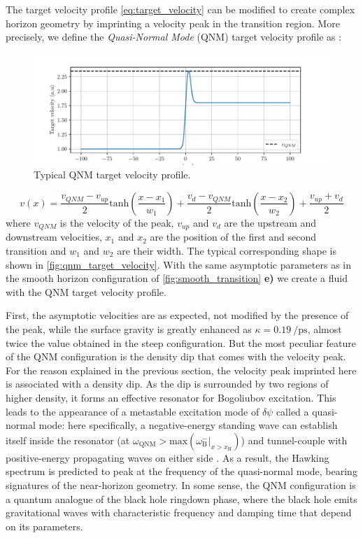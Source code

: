 The target velocity profile \autoref{eq:target_velocity} can be modified to create complex horizon geometry by imprinting 
a velocity peak in the transition region. More precisely, we define the \textit{Quasi-Normal Mode} (QNM) target velocity profile as :

\begin{figure}
    \centering
    \includegraphics[width=1\textwidth]{chap_custom_st/fig/qnm_target_velocity.pdf}
    \caption{Typical QNM target velocity profile.}
    \label{fig:qnm_target_velocity}
\end{figure}


\begin{equation}
    v(x)= \frac{v_{QNM}-v_{up}}{2}\mathrm{tanh}(\frac{x-x_1}{w_1})+ \frac{v_{d}-v_{QNM}}{2}\mathrm{tanh}(\frac{x-x_2}{w_2})+\frac{v_{up}+v_{d}}{2}
    \label{eq:target_velocity_qnm}
\end{equation}
where $v_{QNM}$ is the velocity of the peak, $v_{up}$ and $v_{d}$ are the upstream and downstream velocities, $x_1$ and $x_2$ are the position of the first and second transition and $w_1$ and $w_2$ are their width.
The typical corresponding shape is shown in \autoref{fig:qnm_target_velocity}.
With the same asymptotic parameters as in the smooth horizon configuration of \autoref{fig:smooth_transition} \textbf{e)} we create a fluid with the QNM target velocity profile.


First, the asymptotic velocities are as expected, not modified by the presence of the peak, while the surface gravity 
is greatly enhanced as $\kappa = \SI{0.19}{\per \pico \second}$, almost twice the value obtained in the steep configuration.
But the most peculiar feature of the QNM configuration is the density dip that comes with the velocity peak. For the reason explained in the previous section,
the velocity peak imprinted here is associated with a density dip. As the dip is surrounded by two regions of higher density, it forms an effective resonator for Bogoliubov excitation.
This leads to the appearance of a metastable excitation mode of $\delta \psi$ called a quasi-normal mode: here specifically, a negative-energy standing wave can establish itself inside the resonator (at $\omega_\mathrm{QNM}>\mathrm{max}(\omega_\mathrm{B}^-|_{x>x_\mathrm{H}})$) and tunnel-couple with positive-energy propagating waves on either side \cite{jacquet_quantum_2023}.
As a result, the Hawking spectrum is predicted to peak at the frequency of the quasi-normal mode, bearing signatures of the near-horizon geometry. 
In some sense, the QNM configuration is a quantum analogue of the black hole ringdown phase, where the black hole emits gravitational waves with characteristic frequency and damping time \cite{brito_superradiance_2015} that depend on its parameters. 

